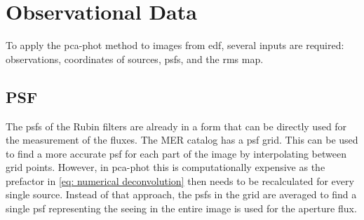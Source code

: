 \newpage

\section{Observational Data}

To apply the \gls{pca-phot} method to images from \gls{edf}, several inputs are required: observations, coordinates of sources, \glspl{psf}, and the \gls{rms} map.


\subsection{PSF}

The \glspl{psf} of the Rubin filters are already in a form that can be directly used for the measurement of the fluxes. The MER catalog has a \gls{psf} grid. This can be used to find a more accurate \gls{psf} for each part of the image by interpolating between grid points. However, in \gls{pca-phot} this is computationally expensive as the prefactor in \autoref{eq: numerical deconvolution} then needs to be recalculated for every single source. Instead of that approach, the \glspl{psf} in the grid are averaged to find a single \gls{psf} representing the seeing in the entire image is used for the aperture flux.






